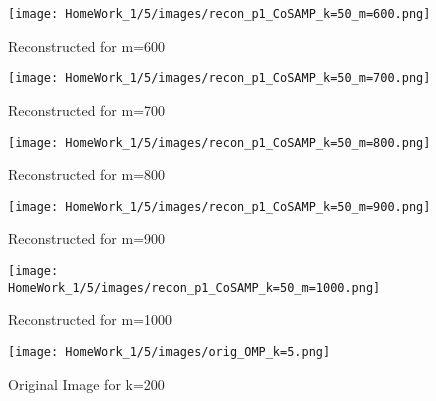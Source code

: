 \documentclass{article}
\begin{document}
\begin{figure}[h!]
    \begin{minipage}{0.1\textwidth}
        \centering
        \texttt{[image: HomeWork\_1/5/images/recon\_p1\_CoSAMP\_k=50\_m=600.png]}
        \caption{Reconstructed for m=600}
    \end{minipage}
    \hspace{0.5cm}
    \begin{minipage}{0.1\textwidth}
        \centering
        \texttt{[image: HomeWork\_1/5/images/recon\_p1\_CoSAMP\_k=50\_m=700.png]}
        \caption{Reconstructed for m=700}
    \end{minipage}
    \hspace{0.5cm}
    \begin{minipage}{0.1\textwidth}
        \centering
        \texttt{[image: HomeWork\_1/5/images/recon\_p1\_CoSAMP\_k=50\_m=800.png]}
        \caption{\small Reconstructed for m=800}
    \end{minipage}
    \hspace{0.5cm}
    \begin{minipage}{0.1\textwidth}
        \centering
        \texttt{[image: HomeWork\_1/5/images/recon\_p1\_CoSAMP\_k=50\_m=900.png]}
        \caption{Reconstructed for m=900}
    \end{minipage}
    \hspace{0.5cm}
    \begin{minipage}{0.1\textwidth}
        \centering
        \texttt{[image: HomeWork\_1/5/images/recon\_p1\_CoSAMP\_k=50\_m=1000.png]}
        \caption{Reconstructed for m=1000}
    \end{minipage}
\end{figure}

\begin{figure}[h!]
        \centering
        \texttt{[image: HomeWork\_1/5/images/orig\_OMP\_k=5.png]}
        \caption{Original Image for k=200}
\end{figure}
\end{document}
